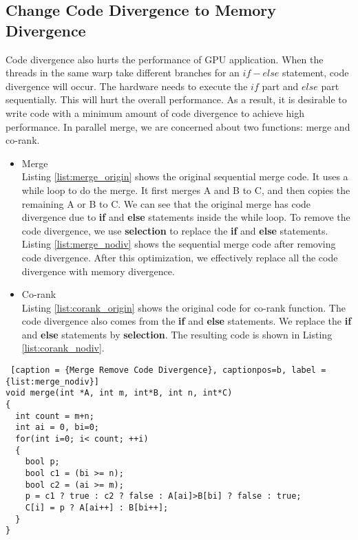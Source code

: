         \subsection{Change Code Divergence to Memory Divergence}\label{set:opt:div}
        Code divergence also hurts the performance of GPU application. When the threads in the 
        same warp take different branches for an $if-else$ statement, code divergence will occur.
        The hardware needs to execute the $if$ part and $else$ part sequentially. This will 
        hurt the overall performance. As a result, it is desirable 
        to write code with a minimum amount of code divergence to achieve high performance.
        In parallel merge, we are concerned about two functions: merge and co-rank.   
        \begin{itemize}
            \item Merge\\ 
                  Listing \ref{list:merge_origin} shows the original sequential merge code. 
                  It uses a while
                  loop to do the merge. It first merges A and B to C, and then copies the 
                  remaining A 
                  or B to C. We can see that the original merge has code divergence due to 
                  \textbf{if} and \textbf{else} statements inside the while loop. 
                  To remove the code divergence, we use \textbf{selection} to replace the 
                  \textbf{if} and \textbf{else} statements.
                  Listing  \ref{list:merge_nodiv} shows the sequential merge code after removing 
                  code divergence. After this optimization, we effectively replace all the code
                  divergence with memory divergence. 
            \item Co-rank\\
                  Listing \ref{list:corank_origin} shows the original code for co-rank function. 
                  The code divergence also comes from the \textbf{if} and \textbf{else} statements. We replace
                  the \textbf{if} and \textbf{else} statements by \textbf{selection}. The resulting code is 
                  shown in Listing \ref{list:corank_nodiv}.
        \end{itemize}

        \begin{minipage}{\linewidth}
        \begin{singlespace}
        \begin{lstlisting} [caption = {Merge Remove Code Divergence}, captionpos=b, label = {list:merge_nodiv}]
void merge(int *A, int m, int*B, int n, int*C) 
{
  int count = m+n;
  int ai = 0, bi=0;
  for(int i=0; i< count; ++i)
  {
    bool p;
    bool c1 = (bi >= n);
    bool c2 = (ai >= m);
    p = c1 ? true : c2 ? false : A[ai]>B[bi] ? false : true; 
    C[i] = p ? A[ai++] : B[bi++];
  }
}
        \end{lstlisting}
        \end{singlespace}
        \end{minipage}

